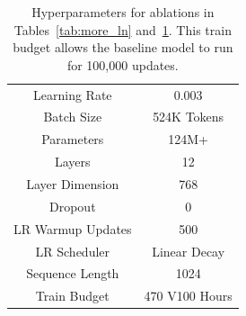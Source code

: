 \documentclass{article} %
\begin{document}
\begin{table}[h]
\begin{center}
\small
\begin{tabular}{@{}cc@{}}
\toprule
Learning Rate     & 0.003            \\ 
Batch Size        & 524K Tokens      \\
Parameters        & 124M+            \\
Layers            & 12               \\
Layer Dimension   & 768              \\
Dropout           & 0                \\
LR Warmup Updates & 500              \\
LR Scheduler      & Linear Decay \\
Sequence Length   & 1024             \\
Train Budget      & 470 V100 Hours   \\ \bottomrule
\end{tabular}
\caption{Hyperparameters for ablations in Tables~\ref{tab:more_ln} and~\ref{tab:ablation_hparams}. This train budget allows the baseline model to run for 100,000 updates.}
\label{tab:ablation_hparams}
\end{center}
\end{table}














\end{document}
